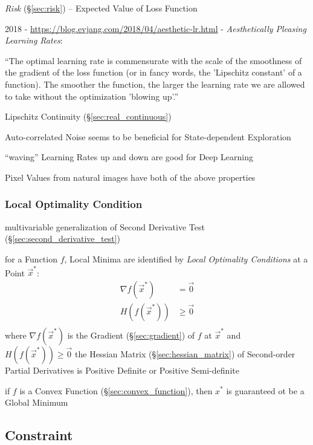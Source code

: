 \fist \emph{Risk} (\S\ref{sec:risk}) -- Expected Value of Loss Function

2018 - \url{https://blog.evjang.com/2018/04/aesthetic-lr.html} - \emph{Aesthetically
  Pleasing Learning Rates}:

``The optimal learning rate is commensurate with the scale of the smoothness of
the gradient of the loss function (or in fancy words, the 'Lipschitz constant'
of a function). The smoother the function, the larger the learning rate we are
allowed to take without the optimization 'blowing up'.''

\fist Lipschitz Continuity (\S\ref{sec:real_continuous})

Auto-correlated Noise seems to be beneficial for State-dependent Exploration

``waving'' Learning Rates up and down are good for Deep Learning

Pixel Values from natural images have both of the above properties



\subsubsection{Local Optimality Condition}\label{sec:local_optimality}


\fist multivariable generalization of Second Derivative Test
(\S\ref{sec:second_derivative_test})

for a Function $f$, Local Minima are identified by \emph{Local Optimality
  Conditions} at a Point $\vec{x}^*$:
\begin{align*}
  \nabla f(\vec{x}^*) & =    \vec{0} \\
  H(f(\vec{x}^*))     & \geq \vec{0} \\
\end{align*}
where $\nabla f(\vec{x}^*)$ is the Gradient (\S\ref{sec:gradient}) of $f$ at
$\vec{x}^*$ and $H(f(\vec{x}^*)) \geq \vec{0}$ the Hessian Matrix
(\S\ref{sec:hessian_matrix}) of Second-order Partial Derivatives is Positive
Definite or Positive Semi-definite

if $f$ is a Convex Function (\S\ref{sec:convex_function}), then $x^*$ is
guaranteed ot be a Global Minimum



\subsection{Constraint}\label{sec:constraint}

